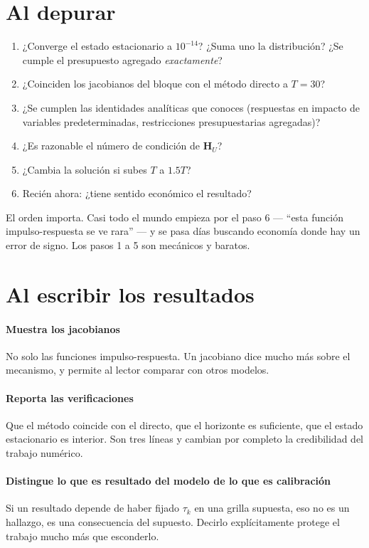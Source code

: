 \section{Al depurar}

\begin{receta}
\begin{enumerate}[leftmargin=1.4em,itemsep=2pt]
\item ¿Converge el estado estacionario a $10^{-14}$? ¿Suma uno la distribución?
¿Se cumple el presupuesto agregado \emph{exactamente}?
\item ¿Coinciden los jacobianos del bloque con el método directo a $T=30$?
\item ¿Se cumplen las identidades analíticas que conoces (respuestas en impacto
de variables predeterminadas, restricciones presupuestarias agregadas)?
\item ¿Es razonable el número de condición de $\mathbf{H}_U$?
\item ¿Cambia la solución si subes $T$ a $1.5T$?
\item Recién ahora: ¿tiene sentido económico el resultado?
\end{enumerate}
\end{receta}

El orden importa. Casi todo el mundo empieza por el paso 6 --- ``esta función
impulso-respuesta se ve rara'' --- y se pasa días buscando economía donde hay un
error de signo. Los pasos 1 a 5 son mecánicos y baratos.

\section{Al escribir los resultados}

\paragraph{Muestra los jacobianos} No solo las funciones impulso-respuesta. Un
jacobiano dice mucho más sobre el mecanismo, y permite al lector comparar con
otros modelos.

\paragraph{Reporta las verificaciones} Que el método coincide con el directo,
que el horizonte es suficiente, que el estado estacionario es interior. Son tres
líneas y cambian por completo la credibilidad del trabajo numérico.

\paragraph{Distingue lo que es resultado del modelo de lo que es calibración}
Si un resultado depende de haber fijado $\tau_k$ en una grilla supuesta, eso no
es un hallazgo, es una consecuencia del supuesto. Decirlo explícitamente protege
el trabajo mucho más que esconderlo.
